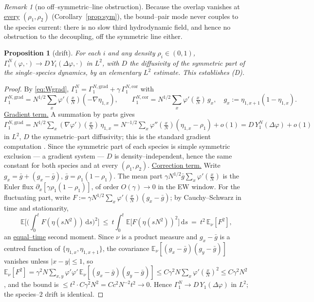 \documentclass[11pt]{article}
\theoremstyle{plain}
\newtheorem{proposition}[theorem]{Proposition}
\theoremstyle{definition}
\theoremstyle{remark}
\newtheorem{remark}[theorem]{Remark}
\newcommand{\E}{\mathbb{E}}\newcommand{\PP}{\mathbb{P}}\newcommand{\dd}{\,\mathrm{d}}
\begin{document}
\begin{remark}[no off--symmetric--line obstruction]\label{rem:offline}
Because the overlap vanishes at \underline{every} $(\rho_1,\rho_2)$ (Corollary~\ref{prop:sym}),
the bound--pair mode never couples to the species current: there is no slow third
hydrodynamic field, and hence no obstruction to the decoupling, off the symmetric line
either.
\end{remark}

\begin{proposition}[drift]\label{prop:drift}
For each $i$ and any density $\rho_i\in(0,1)$,
$\Gamma_i^N(\varphi,\cdot)\to D\,Y_i(\Delta\varphi,\cdot)$ in $L^2$, with $D$ the
diffusivity of the symmetric part of the single--species dynamics, by an elementary
$L^2$ estimate. This establishes \textup{(D)}.
\end{proposition}
\begin{proof}
By \eqref{eq:Wgrad}, $\Gamma_1^N=\Gamma_1^{N,\mathrm{grad}}+\gamma\,\Gamma_1^{N,\mathrm{cor}}$
with
\[
  \Gamma_1^{N,\mathrm{grad}}=N^{1/2}\sum_x\varphi'(\tfrac xN)(-\nabla\eta_{1,x}),\qquad
  \Gamma_1^{N,\mathrm{cor}}=N^{1/2}\sum_x\varphi'(\tfrac xN)\,g_x,\quad g_x:=\eta_{1,x+1}(1-\eta_{1,x}).
\]
\underline{Gradient term.} A summation by parts gives
$\Gamma_1^{N,\mathrm{grad}}=N^{1/2}\sum_x(\nabla\varphi')(\tfrac xN)\,\eta_{1,x}
 =N^{-1/2}\sum_x\varphi''(\tfrac xN)(\eta_{1,x}-\rho_1)+o(1)=D\,Y_1^N(\Delta\varphi)+o(1)$
in $L^2$, $D$ the symmetric--part diffusivity; this is the standard gradient
computation \cite[Ch.~11]{KL}. Since the symmetric part of each species is simple
symmetric exclusion --- a gradient system --- $D$ is density--independent, hence the same
constant for both species and at every $(\rho_1,\rho_2)$.
\underline{Correction term.} Write $g_x=\bar g+(g_x-\bar g)$, $\bar g=\rho_1(1-\rho_1)$. The mean
part $\gamma N^{1/2}\bar g\sum_x\varphi'(\tfrac xN)$ is the Euler flux
$\partial_x[\gamma\rho_1(1-\rho_1)]$, of order $O(\gamma)\to0$ in the EW window. For the
fluctuating part, write $F:=\gamma N^{1/2}\sum_x\varphi'(\tfrac xN)(g_x-\bar g)$; by
Cauchy--Schwarz in time and stationarity,
\[
  \E\Big[\Big(\int_0^t F(\eta(sN^2))\dd s\Big)^2\Big]
  \ \le\ t\int_0^t\E\big[F(\eta(sN^2))^2\big]\dd s\ =\ t^2\,\E_\nu[F^2],
\]
an \underline{equal--time} second moment. Since $\nu$ is a product measure and $g_x-\bar g$
is a centred function of $\{\eta_{1,x},\eta_{1,x+1}\}$, the covariance
$\E_\nu[(g_x-\bar g)(g_y-\bar g)]$ vanishes unless $|x-y|\le1$, so
$\E_\nu[F^2]=\gamma^2N\sum_{x,y}\varphi'\varphi'\,\E_\nu[(g_x-\bar g)(g_y-\bar g)]
\le C\gamma^2N\sum_x\varphi'(\tfrac xN)^2\le C\gamma^2N^2$, and the bound is
$\le t^2\cdot C\gamma^2N^2=Cc^2N^{-2}t^2\to0$. Hence $\Gamma_1^N\to D\,Y_1(\Delta\varphi)$
in $L^2$; the species--$2$ drift is identical.
\end{proof}
\end{document}
